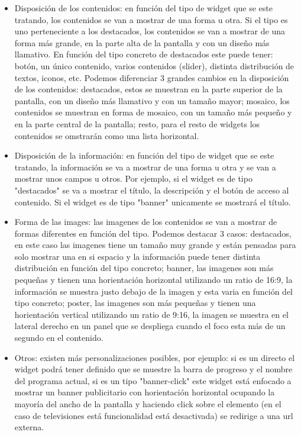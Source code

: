 \begin{itemize}
    \item Disposición de los contenidos: en función del tipo de widget que se este tratando, los contenidos se van a mostrar de una forma u otra. 
    Si el tipo es uno perteneciente a los destacados, los contenidos se van a mostrar de una forma más grande, en la parte alta de la pantalla y con un
    diseño más llamativo. En función del tipo concreto de destacados este puede tener: botón, un único contenido, varios contenidos (slider), distinta
    distribución de textos, iconos, etc. Podemos diferenciar 3 grandes cambios en la disposición de los contenidos: destacados, estos se muestran en la parte
    superior de la pantalla, con un diseño más llamativo y con un tamaño mayor; mosaico,  los contenidos se muestran en forma de mosaico, con un tamaño
    más pequeño y en la parte central de la pantalla; resto, para el resto de widgets los contenidos se omstrarán como una lista horizontal. 
    \item Disposición de la información: en función del tipo de widget que se este tratando, la información se va a mostrar de una forma u otra y se van a mostrar
    unos campos u otros. Por ejemplo, si el widget es de tipo "destacados" se va a mostrar el título, la descripción y el botón de acceso al contenido. Si el widget
    es de tipo "banner" unicamente se mostrará el título.
    \item Forma de las images: las imagenes de los contenidos se van a mostrar de formas diferentes en función del tipo. Podemos destacar 3 casos: destacados, 
    en este caso las imagenes tiene un tamaño muy grande y están pensadas para solo mostrar una en si espacio y la información puede tener distinta distribución en 
    función del tipo concreto; banner, las imagenes son más pequeñas y tienen una horientación horizontal utilizando un ratio de 16:9, la información se muestra justo
    debajo de la imagen y esta varia en función del tipo concreto; poster, las imagenes son más pequeñas y tienen una horientación vertical utilizando un ratio de 9:16,
    la imagen se muestra en el lateral derecho en un panel que se despliega cuando el foco esta más de un segundo en el contenido.
    \item Otros: existen más personalizaciones posibles, por ejemplo: si es un directo el widget podrá tener definido que se muestre la barra de progreso y 
    el nombre del programa actual, si es un tipo "banner-click" este widget está enfocado a mostrar un banner publicitario con horientación horizontal ocupando la mayoría
    del ancho de la pantalla y haciendo click sobre el elemento (en el caso de televisiones está funcionalidad está desactivada) se redirige a una url externa.
\end{itemize}

